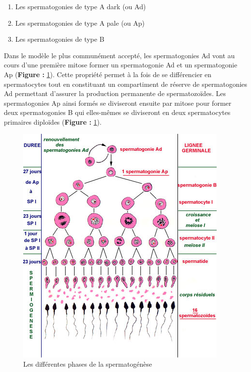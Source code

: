\documentclass[12pt,twoside]{reedthesis}
\providecommand{\tightlist}{%
  \setlength{\itemsep}{0pt}\setlength{\parskip}{0pt}}
\theoremstyle{definition}
\theoremstyle{definition}
\theoremstyle{remark}
\begin{document}
  \begin{enumerate}
  \def\labelenumi{\arabic{enumi}.}
  \tightlist
  \item
    Les spermatogonies de type A dark (ou Ad)\\
  \item
    Les spermatogonies de type A pale (ou Ap)\\
  \item
    Les spermatogonies de type B
  \end{enumerate}
  
  Dans le modèle le plus communément accepté, les spermatogonies Ad vont
  au cours d'une première mitose former un spermatogonie Ad et un
  spermatogonie Ap (\textbf{Figure :} \ref{fig:spermatogenese}). Cette
  propriété permet à la fois de se différencier en spermatocytes tout en
  constituant un compartiment de réserve de spermatogonies Ad permettant
  d'assurer la production permanente de spermatozoïdes. Les spermatogonies
  Ap ainsi formés se diviseront ensuite par mitose pour former deux
  spermatogonies B qui elles-mêmes se diviseront en deux spermatocytes
  primaires diploïdes (\textbf{Figure :} \ref{fig:spermatogenese}).
  
  \begin{figure}
  
  {\centering \includegraphics[scale=0.75]{figure/spermatogenese} 
  
  }
  
  \caption{Les différentes phases de la spermatogénèse}\label{fig:spermatogenese}
  \end{figure}
  
\end{document}
